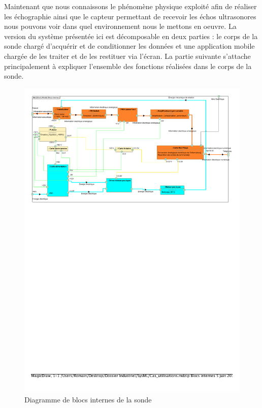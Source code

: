 \documentclass[12pt]{article}
\begin{document}
Maintenant que nous connaissons le phénomène physique exploité afin de réaliser les échographie ainsi que le capteur permettant de recevoir les échos ultrasonores nous pouvons voir dans quel environnement nous le mettons en oeuvre. La version du système présentée ici est décomposable en deux parties : le corps de la sonde chargé d'acquérir et de conditionner les données et une application mobile chargée de les traiter et de les restituer via l'écran. La partie suivante s'attache principalement à expliquer l'ensemble des fonctions réalisées dans le corps de la sonde. \par

\vspace{10pt}

\begin{figure}[!h]
  \hspace{-60pt}
  \includegraphics[width=21cm,trim=.5cm 18cm .5cm 0cm, clip=true]{Images_Rapport/ibdd}
  
  
  \caption{Diagramme de blocs internes de la sonde}
  
\end{figure}
\end{document}
